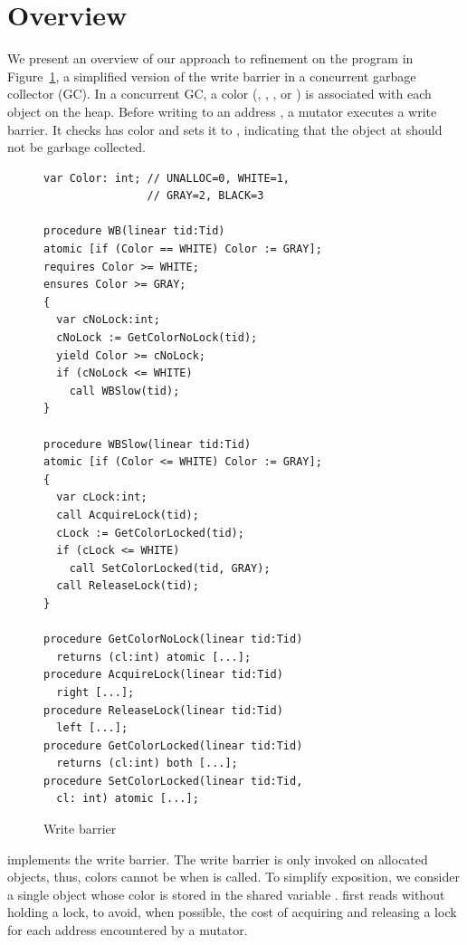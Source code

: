 \section{Overview}
\label{sec:overview}

We present an overview of our approach to refinement on the program in Figure~\ref{fig:reft}, a simplified version of the write barrier in a concurrent garbage collector (GC).
In a concurrent GC, a color (, , , or ) is associated with each object on the heap.  
Before writing to an address , a mutator executes a write barrier. 
It checks  has color  and sets it to , indicating that the object at  should not be garbage collected.
\begin{figure}
\vspace*{-1cm}
{\scriptsize
\begin{verbatim}
var Color: int; // UNALLOC=0, WHITE=1,
                // GRAY=2, BLACK=3

procedure WB(linear tid:Tid)
atomic [if (Color == WHITE) Color := GRAY];
requires Color >= WHITE;
ensures Color >= GRAY;
{
  var cNoLock:int;
  cNoLock := GetColorNoLock(tid);
  yield Color >= cNoLock;
  if (cNoLock <= WHITE) 
    call WBSlow(tid);
}

procedure WBSlow(linear tid:Tid)
atomic [if (Color <= WHITE) Color := GRAY];
{
  var cLock:int;
  call AcquireLock(tid);
  cLock := GetColorLocked(tid);
  if (cLock <= WHITE) 
    call SetColorLocked(tid, GRAY);
  call ReleaseLock(tid);
}

procedure GetColorNoLock(linear tid:Tid) 
  returns (cl:int) atomic [...];
procedure AcquireLock(linear tid:Tid) 
  right [...];
procedure ReleaseLock(linear tid:Tid) 
  left [...];
procedure GetColorLocked(linear tid:Tid) 
  returns (cl:int) both [...];
procedure SetColorLocked(linear tid:Tid, 
  cl: int) atomic [...];
\end{verbatim}
}
\vspace*{-0.3cm}
\caption{Write barrier}
\label{fig:reft}
\end{figure}
 implements the write barrier.
The write barrier is only invoked on allocated objects, thus, colors cannot be  when  is called.
To simplify exposition, we consider a single object whose color is stored in the shared variable . 
 first reads  without holding a lock, to avoid, when possible, the cost of acquiring and releasing a lock for each address encountered by a mutator. 
